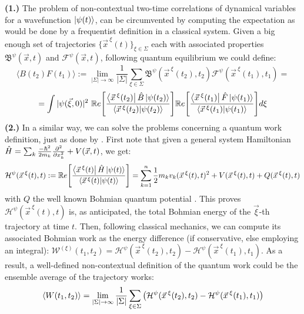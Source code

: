 \documentclass[11pt, a4paper]{article} %
\newcommand{\B}{\mathfrak{B}}
\begin{document}
{\bf (1.)} The problem of non-contextual two-time correlations of dynamical variables for a wavefunction $\ket{\psi(t)}$, can be circumvented by computing the expectation as would be done by a frequentist definition in a classical system. Given a big enough set of trajectories $\{\vec{x}^{\:\xi}(t)\}_{\xi\in \Sigma}$ each with associated properties $\B^\psi(\vec{x},t)$ and $\mathcal{F}^\psi(\vec{x},t)$, following quantum equilibrium \cite{Absolute} we could define:\vspace{-0.2cm}
\begin{equation}
\langle B(t_2)F(t_1)\rangle := \lim_{|\Sigma|\rightarrow \infty}\frac{1}{|\Sigma|} \sum_{\xi\in\Sigma} \B^\psi(\vec{x}^{\:\xi}(t_2),t_2)\mathcal{F}^\psi(\vec{x}^{\:\xi}(t_1),t_1) =
\end{equation}
$$
=  \int |\psi(\vec{\xi},0)|^2\ \mathbb{R}e\qty[ \frac{\bra{\vec{x}^{\:\xi}(t_2)}\hat{B}\ket{\psi(t_2)}}{\bra{\vec{x}^{\:\xi}(t_2)}\ket{\psi(t_2)}} ] \mathbb{R}e\qty[ \frac{\bra{\vec{x}^{\:\xi}(t_1)}\hat{F}\ket{\psi(t_1)}}{\bra{\vec{x}^{\:\xi}(t_1)}\ket{\psi(t_1)}} ]d\xi
$$
{\bf (2.) } In a similar way, we can solve the problems concerning a quantum work definition, just as done by \cite{work1, work2}. First note that given a general system Hamiltonian $\hat{H}=\sum_k \frac{-\hbar^2}{2m_k}\pdv[2]{}{x_k}+V(\vec{x},t)$, we get:
\begin{equation}
\mathcal{H}^\psi(\vec{x}^{\:\xi}(t),t) := \mathbb{R}e\qty[ \frac{\bra{\vec{x}^{\:\xi}(t)}\hat{H}\ket{\psi(t)}}{\bra{\vec{x}^{\:\xi}(t)}\ket{\psi(t)}} ] = \sum_{k=1}^n\frac{1}{2}m_kv_k(\vec{x}^{\:\xi}(t),t)^2+V(\vec{x}^{\:\xi}(t),t)+Q(\vec{x}^{\:\xi}(t),t)
\end{equation}
with $Q$ the well known Bohmian quantum potential \cite{Holland, Durr, JordiXavier}. This proves $\mathcal{H}^\psi(\vec{x}^{\:\xi}(t),t)$ is, as anticipated, the total Bohmian energy of the $\vec{\xi}$-th trajectory at time $t$. Then, following classical mechanics, we can compute its associated Bohmian work as the energy difference (if conservative, else employing an integral): $\mathcal{W}^{(\xi)}(t_1,t_2)= \mathcal{H}^\psi(\vec{x}^{\:\xi}(t_2),t_2)-\mathcal{H}^\psi(\vec{x}^{\:\xi}(t_1),t_1)$. As a result, a well-defined non-contextual definition of the quantum work could be the ensemble average of the trajectory works:
\begin{equation}
\langle W(t_1,t_2)\rangle = \lim_{|\Sigma|\rightarrow \infty}\frac{1}{|\Sigma|} \sum_{\xi\in\Sigma} \qty(\mathcal{H}^\psi(\vec{x}^{\:\xi}(t_2),t_2)-\mathcal{H}^\psi(\vec{x}^{\:\xi}(t_1),t_1))
\end{equation}
\end{document}
